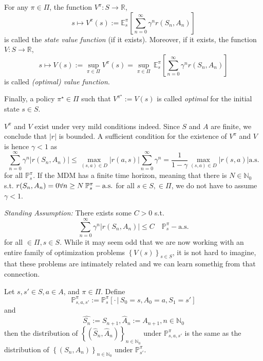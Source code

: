 \begin{definition}
    For any \( \pi \in \Pi \), the function \( V^\pi: S \to \mathbb{R} \),
    \[ s \mapsto V^\pi(s) := \mathbb{E}_s^\pi\left[ \sum_{n=0}^{\infty}\gamma^n r(S_n, A_n) \right] \]
    is called the \emph{state value function} (if it exists).
    Moreover, if it exists, the function \( V: S \to \mathbb{R} \), 
    \[
        s \mapsto V(s) := \sup_{\pi \in \Pi} V^\pi (s) = \sup_{\pi \in \Pi}\, \mathbb{E}_{s}^{\pi}\left[ \sum_{n=0}^{\infty} \gamma^n r(S_n, A_n) \right]
    \] 
    is called \emph{(optimal) value function}.

    Finally, a policy \( \pi^\star \in \Pi \) such that \( V^{\pi^\star} := V(s) \) is called \emph{optimal} for the initial state \( s \in S \). 

\end{definition}

\begin{remark}
    \( V^\pi \) and \( V \) exist under very mild conditions indeed. Since \( S \) and \( A \) are finite, we conclude that \( |r| \) is bounded. A sufficient condition for the existence of \( V^\pi \) and \( V \) is hence \( \gamma < 1  \) as 
    \[
        \sum_{n=0}^{\infty} \gamma^n | r(S_n, A_n)| \leq \max_{(s,a) \in D} | r(a,s) | \sum_{n=0}^{\infty} \gamma^n = \frac{1}{1-\gamma} \max_{(s,a) \in D} |r(s,a)| \text{a.s.}
    \]        
    for all \( \mathbb{P}_s^\pi \). If the MDM has a finite time horizon, meaning that there is \( N \in \mathbb{N}_{0} \) s.t. \( r(S_n, A_n) = 0 \forall n \geq N\:  \mathbb{P}_s^\pi-\text{a.s.}\) for all \( s \in S,  \in \Pi \), we do not have to assume \( \gamma < 1 \).

\end{remark}

\emph{Standing Assumption:} There exists some \( C > 0 \) s.t. 
\[
    \sum_{n=0}^{\infty} \gamma^n | r(S_n, A_n)| \leq C\quad  \mathbb{P}_s^\pi-\text{a.s.}
\] 
for all \(  \in \Pi, s \in S\). 
While it may seem odd that we are now working with an entire family of optimization problems \( \left\{ V(s) \right\}_{s \in S} \), it is not hard to imagine, that these problems are intimately related and we can learn somethig from that connection.

\begin{lemma}
    \label{time_shift_lemma}
    Let \( s,s' \in S, a \in A \), and \( \pi \in \Pi \).
    Define 
    \[
        \mathbb{P}_{s,a,s'}^\pi := \mathbb{P}_s^\pi[ \cdot \,|\, S_{0} = s, A_{0} = a, S_{1} = s']
    \] 
    and 
    \[
        \hat{S_n} := S_{n+1}, \hat{A}_n := A_{n+1}, n \in \mathbb{N}_{0}
    \]
    then the distribution of \( \left\{ (\hat{S}_n, \hat{A}_n) \right\}_{n \in \mathbb{N}_{0}} \) under \( \mathbb{P}_{s,a,s'}^\pi \) is the same as the distribution of 
    \( \left\{ (S_n, A_n) \right\}_{n \in \mathbb{N}_{0}} \) under \( \mathbb{P}_{s'}^\pi \).    
\end{lemma}


